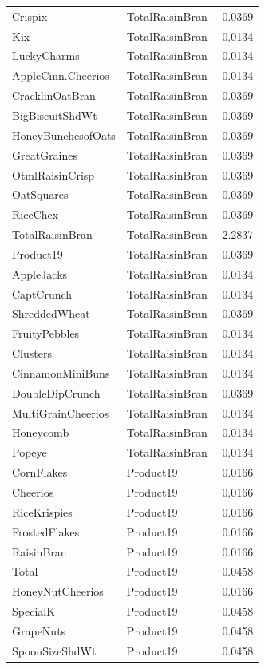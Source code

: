 \begin{longtable}{llr}
Crispix & TotalRaisinBran & 0.0369 \\
Kix & TotalRaisinBran & 0.0134 \\
LuckyCharms & TotalRaisinBran & 0.0134 \\
AppleCinn.Cheerios & TotalRaisinBran & 0.0134 \\
CracklinOatBran & TotalRaisinBran & 0.0369 \\
BigBiscuitShdWt & TotalRaisinBran & 0.0369 \\
HoneyBunchesofOats & TotalRaisinBran & 0.0369 \\
GreatGraines & TotalRaisinBran & 0.0369 \\
OtmlRaisinCrisp & TotalRaisinBran & 0.0369 \\
OatSquares & TotalRaisinBran & 0.0369 \\
RiceChex & TotalRaisinBran & 0.0369 \\
TotalRaisinBran & TotalRaisinBran & -2.2837 \\
Product19 & TotalRaisinBran & 0.0369 \\
AppleJacks & TotalRaisinBran & 0.0134 \\
CaptCrunch & TotalRaisinBran & 0.0134 \\
ShreddedWheat & TotalRaisinBran & 0.0369 \\
FruityPebbles & TotalRaisinBran & 0.0134 \\
Clusters & TotalRaisinBran & 0.0134 \\
CinnamonMiniBuns & TotalRaisinBran & 0.0134 \\
DoubleDipCrunch & TotalRaisinBran & 0.0369 \\
MultiGrainCheerios & TotalRaisinBran & 0.0134 \\
Honeycomb & TotalRaisinBran & 0.0134 \\
Popeye & TotalRaisinBran & 0.0134 \\
CornFlakes & Product19 & 0.0166 \\
Cheerios & Product19 & 0.0166 \\
RiceKrispies & Product19 & 0.0166 \\
FrostedFlakes & Product19 & 0.0166 \\
RaisinBran & Product19 & 0.0166 \\
Total & Product19 & 0.0458 \\
HoneyNutCheerios & Product19 & 0.0166 \\
SpecialK & Product19 & 0.0458 \\
GrapeNuts & Product19 & 0.0458 \\
SpoonSizeShdWt & Product19 & 0.0458 \\

\end{longtable}
